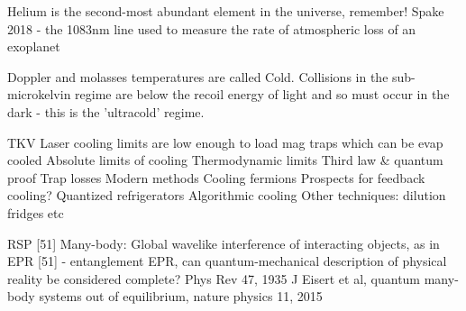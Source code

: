 Helium is the second-most abundant element in the universe, remember!
	Spake 2018 - the 1083nm line used to measure the rate of atmospheric loss of an exoplanet


	Doppler and molasses temperatures are called Cold.
	Collisions in the sub-microkelvin regime are below the recoil energy of light and so must occur in the dark - this is the 'ultracold' regime.
	
	TKV Laser cooling limits are low enough to load mag traps which can be evap cooled
	Absolute limits of cooling Thermodynamic limits Third law \& quantum	proof Trap losses Modern methods Cooling fermions Prospects for feedback	cooling? Quantized refrigerators Algorithmic cooling Other techniques:	dilution fridges etc
		
	

	RSP [51] Many-body: Global wavelike interference of interacting objects, as in EPR [51] - entanglement 
		EPR, can quantum-mechanical description of physical reality be considered complete? Phys Rev 47, 1935
		J Eisert et al, quantum many-body systems out of equilibrium, nature physics 11, 2015